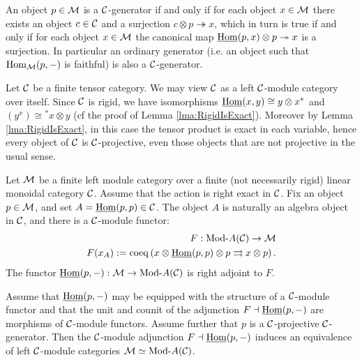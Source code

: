 \documentclass{amsart}
\begin{document}
\begin{remark} \label{rem:gen}
	An object $p \in \mathcal M$ is a $\mathcal C$-generator if and only if for each object $x \in \mathcal M$ there exists an object $c \in \mathcal C$ and a surjection $c \otimes p \twoheadrightarrow x$, which in turn is true if and only if for each object $x \in \mathcal M$ the canonical map $\operatorname{\underline{Hom}}(p,x) \otimes p \twoheadrightarrow x$ is a surjection. In particular an ordinary generator (i.e. an object such that $\operatorname{Hom}_\mathcal M(p,-)$ is faithful) is also a $\mathcal C$-generator.  
\end{remark}

\begin{example} \label{ex:rigid_all_C-proj}
	Let $\mathcal C$ be a finite tensor category. We may view $\mathcal C$ as a left $\mathcal C$-module category over itself. Since $\mathcal C$ is rigid, we have isomorphisms $\operatorname{\underline{Hom}}(x,y) \cong y \otimes x^*$ and $(y^x) \cong {}^*x \otimes y$ (cf the proof of Lemma \ref{lma:RigidIsExact}). Moreover by Lemma \ref{lma:RigidIsExact}, in this case the tensor product is exact in each variable, hence every object of $\mathcal C$ is $\mathcal C$-projective, even those objects that are not projective in the usual sense. %
\end{example}


\begin{theorem} \label{thm:C-module-Embedding} %
	Let $\mathcal M$ be a finite left module category over a finite (not necessarily rigid) linear monoidal category $\mathcal C$. Assume that the action is right exact in $\mathcal C$. 
	Fix an object $p \in \mathcal M$, and set $A = \operatorname{\underline{Hom}}(p,p) \in \mathcal C$. The object $A$ is naturally an algebra object in $\mathcal C$, and there is a $\mathcal C$-module functor:
	\begin{align*}
		F:   \Mod{}{A}(\cC) \to \cM \\
		F(x_A) := \coeq \left( x \otimes \IHom(p,p) \otimes p \rightrightarrows x \otimes p \right).
	\end{align*}
The functor $\IHom(p,-): \cM \to \Mod{}{A}(\cC)$ is right adjoint to $F$. 

Assume that $\operatorname{\underline{Hom}}(p,-)$ may be equipped with the structure of a $\mathcal C$-module functor and that the unit and counit of the adjunction $F \dashv \operatorname{\underline{Hom}}(p,-)$ are morphisms of $\mathcal C$-module functors. Assume further that $p$ is a $\mathcal C$-projective $\mathcal C$-generator.  Then the $\mathcal C$-module adjunction  $F \dashv \operatorname{\underline{Hom}}(p,-)$
	induces an equivalence of left $\mathcal C$-module categories $\cM \simeq \Mod{}{A}(\cC)$. 
\end{theorem}
\end{document}
